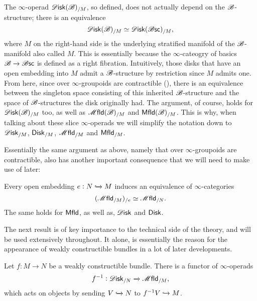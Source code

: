 \documentclass[../text]{subfiles}
\begin{document}
\begin{remark}\label{rem:disk_b=disk_bsc}
    The $\infty$-operad $\disk(\bstr)_{/M}$, so defined, does not actually depend on the $\mathscr{B}$-structure; there is an equivalence
    \begin{equation}
        \disk(\bstr)_{/M} \simeq \disk(\bsc)_{/M},
    \end{equation}
    where $M$ on the right-hand side is the underlying stratified manifold of the $\mathscr{B}$-manifold also called $M$. This is essentially because the $\infty$-cateogry of basics $\mathscr{B} \xrightarrow{} \mathscr{B} \mathsf{sc}$ is defined as a right fibration. Intuitively, those disks that have an open embedding into $M$ admit a $\mathscr{B}$-structure by restriction since $M$ admits one. From here, since over $\infty$-groupoids are contractible (\cite[\href{https://kerodon.net/tag/018Y}{018Y}]{lurie_kerodon}), there is an equivalence between the singleton space consisting of this inherited $\mathscr{B}$-structure and the space of $\mathscr{B}$-structures the disk originally had. The argument, of course, holds for $\disk(\bstr)_{/M}$ too, as well as $\mfld(\bstr)_{/M}$ and $\mfld[r](\bstr)_{/M}$. This is why, when talking about these slice $\infty$-operads we will simplify the notation down to $\disk_{/M}$, $\disk[r]_{/M}$, $\mfld_{/M}$ and $\mfld[r]_{/M}$.
\end{remark}

Essentially the same argument as above, namely that over $\infty$-groupoids are contractible, also has another important consequence that we will need to make use of later:

\begin{lemma}\label{lem:double_slice}
    Every open embedding $e: N \xhookrightarrow{} M$ induces an equivalence of $\infty$-categories
    \begin{equation}
        (\mfld_{/M})_{/e} \simeq \mfld_{/N}.
    \end{equation}
    The same holds for $\mfld[r]$, as well as, $\disk$ and $\disk[r]$.
\end{lemma}

The next result is of key importance to the technical side of the theory, and will be used extensively throughout. It alone, is essentially the reason for the appearance of weakly constructible bundles in a lot of later developments.

\begin{lemma}\label{lem:f^-1}
    Let $f: M \xrightarrow{} N$ be a weakly constructible bundle. There is a functor of $\infty$-operads
    \begin{equation}
        f^{-1}: \disk_{/N} \xrightarrow{} \mfld_{/M},
    \end{equation}
    which acts on objects by sending $V \xhookrightarrow{} N$ to $f^{-1}V \xhookrightarrow{} M$.
\end{lemma}
\end{document}
